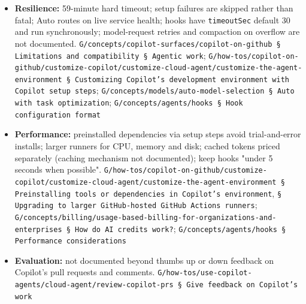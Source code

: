 \begin{itemize}
\item \textbf{Resilience:} 59-minute hard timeout; setup failures are skipped rather than fatal; Auto routes on live service health; hooks have \texttt{timeoutSec} default 30 and run synchronously; model-request retries and compaction on overflow are not documented. \texttt{G/\allowbreak{}concepts/\allowbreak{}copilot-\allowbreak{}surfaces/\allowbreak{}copilot-\allowbreak{}on-\allowbreak{}github § Limitations and compatibility § Agentic work}; \texttt{G/\allowbreak{}how-\allowbreak{}tos/\allowbreak{}copilot-\allowbreak{}on-\allowbreak{}github/\allowbreak{}customize-\allowbreak{}copilot/\allowbreak{}customize-\allowbreak{}cloud-\allowbreak{}agent/\allowbreak{}customize-\allowbreak{}the-\allowbreak{}agent-\allowbreak{}environment § Customizing Copilot's development environment with Copilot setup steps}; \texttt{G/\allowbreak{}concepts/\allowbreak{}models/\allowbreak{}auto-\allowbreak{}model-\allowbreak{}selection § Auto with task optimization}; \texttt{G/\allowbreak{}concepts/\allowbreak{}agents/\allowbreak{}hooks § Hook configuration format}
\item \textbf{Performance:} preinstalled dependencies via setup steps avoid trial-and-error installs; larger runners for CPU, memory and disk; cached tokens priced separately (caching mechanism not documented); keep hooks "under 5 seconds when possible". \texttt{G/\allowbreak{}how-\allowbreak{}tos/\allowbreak{}copilot-\allowbreak{}on-\allowbreak{}github/\allowbreak{}customize-\allowbreak{}copilot/\allowbreak{}customize-\allowbreak{}cloud-\allowbreak{}agent/\allowbreak{}customize-\allowbreak{}the-\allowbreak{}agent-\allowbreak{}environment § Preinstalling tools or dependencies in Copilot's environment}, \texttt{§ Upgrading to larger GitHub-\allowbreak{}hosted GitHub Actions runners}; \texttt{G/\allowbreak{}concepts/\allowbreak{}billing/\allowbreak{}usage-\allowbreak{}based-\allowbreak{}billing-\allowbreak{}for-\allowbreak{}organizations-\allowbreak{}and-\allowbreak{}enterprises § How do AI credits work?}; \texttt{G/\allowbreak{}concepts/\allowbreak{}agents/\allowbreak{}hooks § Performance considerations}
\item \textbf{Evaluation:} not documented beyond thumbs up or down feedback on Copilot's pull requests and comments. \texttt{G/\allowbreak{}how-\allowbreak{}tos/\allowbreak{}use-\allowbreak{}copilot-\allowbreak{}agents/\allowbreak{}cloud-\allowbreak{}agent/\allowbreak{}review-\allowbreak{}copilot-\allowbreak{}prs § Give feedback on Copilot's work}
\end{itemize}

